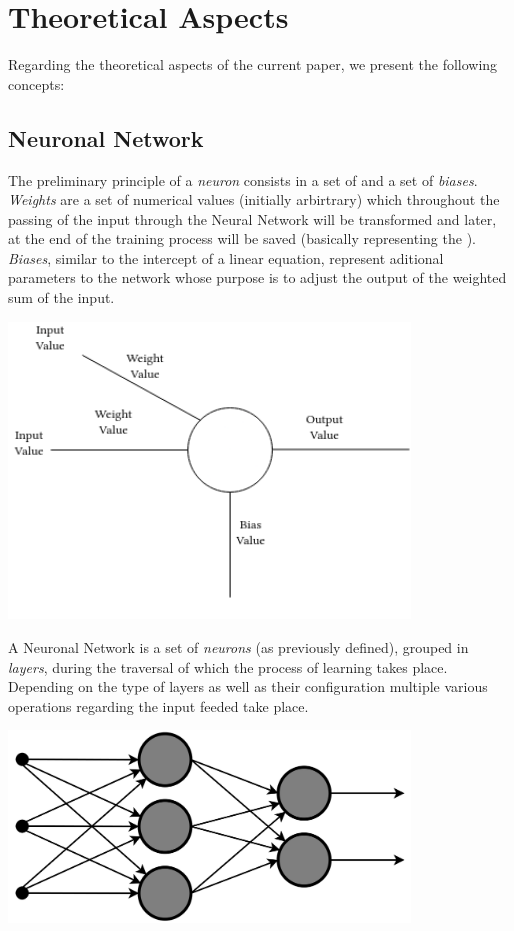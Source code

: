 \chapter{Theoretical Aspects}

Regarding the theoretical aspects of the current paper, we present the following concepts:
\section{Neuronal Network}
The preliminary principle of a \textit{neuron} consists in a set of  and a set of \textit{biases}.
\textit{Weights} are a set of numerical values (initially arbirtrary) which throughout the passing
of the input through the Neural Network will be transformed and later, at the end of the training
process will be saved (basically representing the ).
\textit{Biases}, similar to the intercept of a linear equation, represent aditional parameters to the network whose
purpose is to adjust the output of the weighted sum of the input.

\begin{center}
	\includegraphics[width = 4.2in]{images/genericneuron.png}
	\centerline{}
\label{neuron}
\end{center}

A Neuronal Network is a set of \textit{neurons} (as previously defined), grouped in \textit{layers},
during the traversal of which the process of learning takes place.
Depending on the type of layers as well as their configuration multiple various operations regarding the input feeded take
place.

\begin{center}
	\includegraphics[width = 4.2in]{images/genericnn.png}
	\centerline{}
\label{nn}
\end{center}



